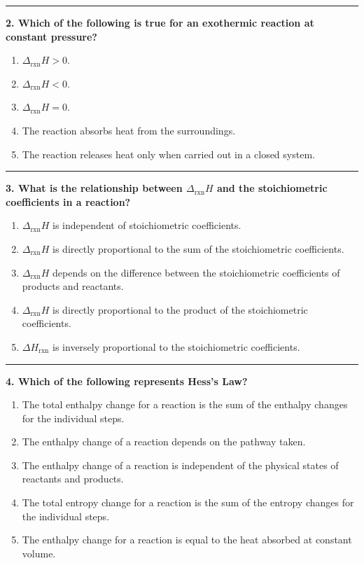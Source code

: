 \documentclass[
  9pt,
]{extbook}
\providecommand{\tightlist}{%
  \setlength{\itemsep}{0pt}\setlength{\parskip}{0pt}}
\theoremstyle{definition}
\theoremstyle{definition}
\theoremstyle{definition}
\theoremstyle{remark}
\begin{document}
\begin{center}\rule{0.5\linewidth}{0.5pt}\end{center}

\textbf{2. Which of the following is true for an exothermic reaction at constant pressure?}

\begin{enumerate}
\def\labelenumi{\alph{enumi}.}
\tightlist
\item
  \(\Delta_{\text{rxn}} H > 0\).
\item
  \(\Delta_{\text{rxn}} H < 0\).
\item
  \(\Delta_{\text{rxn}} H = 0\).
\item
  The reaction absorbs heat from the surroundings.
\item
  The reaction releases heat only when carried out in a closed system.
\end{enumerate}

\begin{center}\rule{0.5\linewidth}{0.5pt}\end{center}

\textbf{3. What is the relationship between \(\Delta_{\text{rxn}} H\) and the stoichiometric coefficients in a reaction?}

\begin{enumerate}
\def\labelenumi{\alph{enumi}.}
\tightlist
\item
  \(\Delta_{\text{rxn}} H\) is independent of stoichiometric coefficients.
\item
  \(\Delta_{\text{rxn}} H\) is directly proportional to the sum of the stoichiometric coefficients.
\item
  \(\Delta_{\text{rxn}} H\) depends on the difference between the stoichiometric coefficients of products and reactants.
\item
  \(\Delta_{\text{rxn}} H\) is directly proportional to the product of the stoichiometric coefficients.
\item
  \(\Delta H_{\text{rxn}}\) is inversely proportional to the stoichiometric coefficients.
\end{enumerate}

\begin{center}\rule{0.5\linewidth}{0.5pt}\end{center}

\textbf{4. Which of the following represents Hess's Law?}

\begin{enumerate}
\def\labelenumi{\alph{enumi}.}
\tightlist
\item
  The total enthalpy change for a reaction is the sum of the enthalpy changes for the individual steps.
\item
  The enthalpy change of a reaction depends on the pathway taken.
\item
  The enthalpy change of a reaction is independent of the physical states of reactants and products.
\item
  The total entropy change for a reaction is the sum of the entropy changes for the individual steps.
\item
  The enthalpy change for a reaction is equal to the heat absorbed at constant volume.
\end{enumerate}
\end{document}
